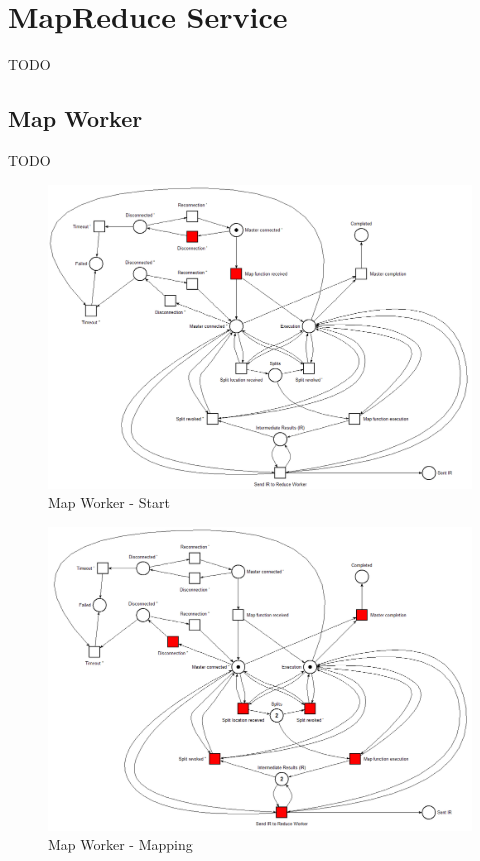 \section{MapReduce Service}\label{mapreduce_service}
TODO

\subsection{Map Worker}
TODO

\begin{figure}[!ht]
    \centering
    \includegraphics[width=\linewidth]{document/chapters/chapter_6/images/map_worker_petri_net_1.png}
    \caption{Map Worker - Start}
    \label{fig:map_worker_petri_net_1}
\end{figure}

\begin{figure}[!ht]
    \centering
    \includegraphics[width=\linewidth]{document/chapters/chapter_6/images/map_worker_petri_net_2.png}
    \caption{Map Worker - Mapping}
    \label{fig:map_worker_petri_net_2}
\end{figure}

